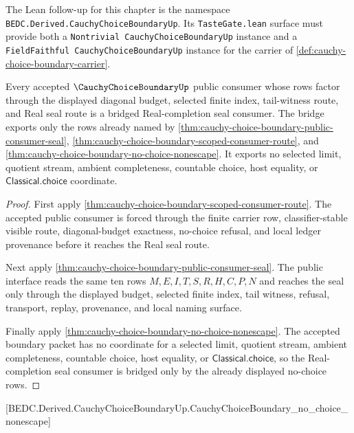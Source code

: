 The Lean follow-up for this chapter is the namespace \texttt{BEDC.Derived.CauchyChoiceBoundaryUp}. Its \texttt{TasteGate.lean} surface must provide both a \texttt{Nontrivial CauchyChoiceBoundaryUp} instance and a \texttt{FieldFaithful CauchyChoiceBoundaryUp} instance for the carrier of \autoref{def:cauchy-choice-boundary-carrier}.

\begin{theorem}
\label{thm:cauchy-choice-boundary-bridged-real-seal}
Every accepted $\CauchyChoiceBoundaryUp$ public consumer whose rows factor through the displayed diagonal budget, selected finite index, tail-witness route, and Real seal route is a bridged Real-completion seal consumer. The bridge exports only the rows already named by \autoref{thm:cauchy-choice-boundary-public-consumer-seal}, \autoref{thm:cauchy-choice-boundary-scoped-consumer-route}, and \autoref{thm:cauchy-choice-boundary-no-choice-nonescape}. It exports no selected limit, quotient stream, ambient completeness, countable choice, host equality, or $\mathsf{Classical.choice}$ coordinate.
\end{theorem}
\begin{proof}
First apply \autoref{thm:cauchy-choice-boundary-scoped-consumer-route}. The accepted public consumer is forced through the finite carrier row, classifier-stable visible route, diagonal-budget exactness, no-choice refusal, and local ledger provenance before it reaches the Real seal route.

Next apply \autoref{thm:cauchy-choice-boundary-public-consumer-seal}. The public interface reads the same ten rows $M,E,I,T,S,R,H,C,P,N$ and reaches the seal only through the displayed budget, selected finite index, tail witness, refusal, transport, replay, provenance, and local naming surface.

Finally apply \autoref{thm:cauchy-choice-boundary-no-choice-nonescape}. The accepted boundary packet has no coordinate for a selected limit, quotient stream, ambient completeness, countable choice, host equality, or $\mathsf{Classical.choice}$, so the Real-completion seal consumer is bridged only by the already displayed no-choice rows.
\end{proof}

[BEDC.Derived.CauchyChoiceBoundaryUp.CauchyChoiceBoundary\_no\_choice\_nonescape]

